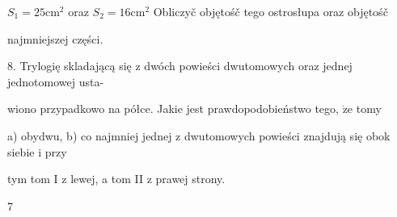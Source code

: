 \documentclass[a4paper,12pt]{article}
\begin{document}
$S_{1} = 25 \mathrm{c}\mathrm{m}^{2}$ oraz $S_{2} = 16 \mathrm{c}\mathrm{m}^{2}$ Obliczyč objętośč tego ostrosłupa oraz objętośč

najmniejszej części.

8. Trylogię skladającą się $\mathrm{z}$ dwóch powieści dwutomowych oraz jednej jednotomowej usta-

wiono przypadkowo na półce. Jakie jest prawdopodobieństwo tego, $\dot{\mathrm{z}}\mathrm{e}$ tomy

a) obydwu, b) co najmniej jednej $\mathrm{z}$ dwutomowych powieści znajdują się obok siebie $\mathrm{i}$ przy

tym tom I $\mathrm{z}$ lewej, a tom II $\mathrm{z}$ prawej strony.

7
\end{document}
